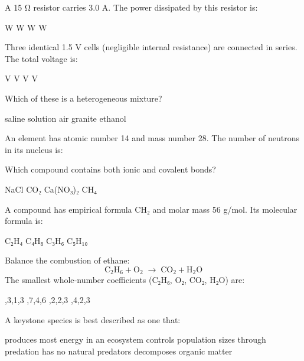 \documentclass[12pt,letterpaper]{exam}
\begin{document}
\begin{questions}
\question[1] A 15 Ω resistor carries 3.0 A. The power dissipated by this resistor is:    
\begin{oneparchoices}  
   W  
   W  
   W  
   W  
\end{oneparchoices}  
  
\question[1] Three identical 1.5 V cells (negligible internal resistance) are connected in series. The total voltage is:    
\begin{oneparchoices}  
   V  
   V  
   V  
   V  
\end{oneparchoices}  
  
\question[1] Which of these is a heterogeneous mixture?    
\begin{oneparchoices}  
  \choice saline solution  
  \choice air  
  \choice granite  
  \choice ethanol  
\end{oneparchoices}  
  
\question[1] An element has atomic number 14 and mass number 28. The number of neutrons in its nucleus is:    
\begin{oneparchoices}  
\end{oneparchoices}  
  
\question[1] Which compound contains both ionic and covalent bonds?    
\begin{oneparchoices}  
  \choice NaCl  
  \choice CO₂  
  \choice Ca(NO₃)₂  
  \choice CH₄  
\end{oneparchoices}  
  
\question[1] A compound has empirical formula CH₂ and molar mass 56 g/mol. Its molecular formula is:    
\begin{oneparchoices}  
  \choice C₂H₄  
  \choice C₄H₈  
  \choice C₃H₆  
  \choice C₅H₁₀  
\end{oneparchoices}  
  
\question[1] Balance the combustion of ethane:    
\[  
  \text{C}_2\text{H}_6 + \text{O}_2 \;\longrightarrow\; \text{CO}_2 + \text{H}_2\text{O}  
\]  
The smallest whole‐number coefficients (C₂H₆, O₂, CO₂, H₂O) are:    
\begin{oneparchoices}  
  ,3,1,3  
  ,7,4,6  
  ,2,2,3  
  ,4,2,3  
\end{oneparchoices}  
  
\question[1] A keystone species is best described as one that:    
\begin{oneparchoices}  
  \choice produces most energy in an ecosystem  
  \choice controls population sizes through predation  
  \choice has no natural predators  
  \choice decomposes organic matter  
\end{oneparchoices}  
  

\end{questions}
\end{document}
